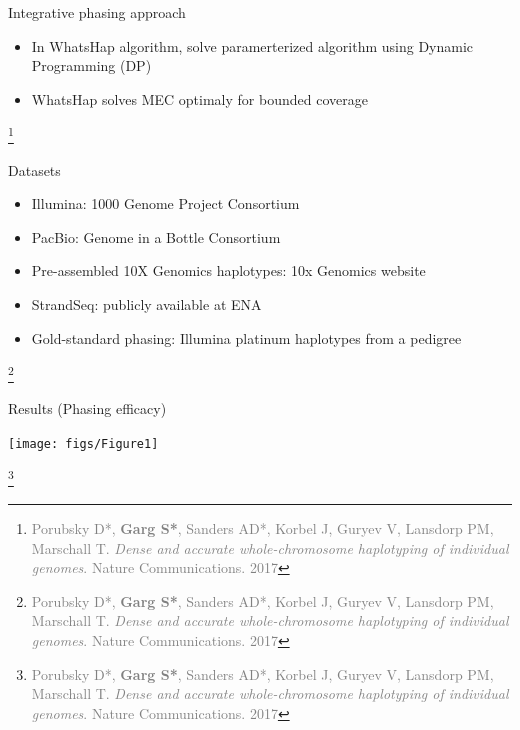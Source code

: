 \documentclass[notes=hide]{beamer}
\begin{document}


\begin{frame}{Integrative phasing approach}
\begin{block}{}
\begin{itemize}
 \item In WhatsHap algorithm, solve paramerterized algorithm using Dynamic Programming (DP)
 \item WhatsHap solves MEC optimaly for bounded coverage
\end{itemize}
\end{block}
\let\thefootnote\relax\footnote{\tiny\textcolor{gray}{Porubsky D*, \textbf{Garg S*}, Sanders AD*, Korbel J, Guryev V, Lansdorp PM, Marschall T. \textit{Dense and accurate whole-chromosome haplotyping of individual genomes}. Nature Communications. 2017}}
\end{frame}


\begin{frame}{Datasets}
\begin{itemize}
 \item Illumina: 1000 Genome Project Consortium
 \item PacBio: Genome in a Bottle Consortium
 \item Pre-assembled 10X Genomics haplotypes: 10x Genomics website
 \item StrandSeq: publicly available at ENA
 \item Gold-standard phasing: Illumina platinum haplotypes from a pedigree
\end{itemize}
\let\thefootnote\relax\footnote{\tiny\textcolor{gray}{Porubsky D*, \textbf{Garg S*}, Sanders AD*, Korbel J, Guryev V, Lansdorp PM, Marschall T. \textit{Dense and accurate whole-chromosome haplotyping of individual genomes}. Nature Communications. 2017}}

\end{frame}

\begin{frame}{Results (Phasing efficacy)}
\begin{center}
\texttt{[image: figs/Figure1]}
\end{center}
\let\thefootnote\relax\footnote{\tiny\textcolor{gray}{Porubsky D*, \textbf{Garg S*}, Sanders AD*, Korbel J, Guryev V, Lansdorp PM, Marschall T. \textit{Dense and accurate whole-chromosome haplotyping of individual genomes}. Nature Communications. 2017}}

\end{frame}
\end{document}
